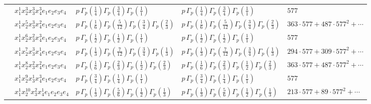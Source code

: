 \documentclass[11pt]{article}
\begin{document}
\begin{table}[ht]
{\begin{tabular}{@{}lllll@{}}
 & $x_{1}^{1} x_{2}^{3} x_{3}^{3} x_{4}^{3}  e_{1} e_{2} e_{3} e_{4}$ & $p \, \Gamma_p \left( \frac{1}{4} \right) \Gamma_p \left( \frac{3}{4} \right) \Gamma_p \left( \frac{1}{1} \right)$ & $p \, \Gamma_p \left( \frac{1}{4} \right) \Gamma_p \left( \frac{3}{4} \right) \Gamma_p \left( \frac{1}{1} \right)$ & $577$ \\
 & $x_{1}^{1} x_{2}^{5} x_{3}^{3} x_{4}^{2}  e_{1} e_{2} e_{3} e_{4}$ & $p \, \Gamma_p \left( \frac{1}{6} \right) \Gamma_p \left( \frac{5}{12} \right) \Gamma_p \left( \frac{3}{4} \right) \Gamma_p \left( \frac{2}{3} \right)$ & $p \, \Gamma_p \left( \frac{1}{6} \right) \Gamma_p \left( \frac{5}{12} \right) \Gamma_p \left( \frac{3}{4} \right) \Gamma_p \left( \frac{2}{3} \right)$ & $363{\cdot}577{+}487{\cdot}577^{2}{+}\cdots$ \\
 & $x_{1}^{1} x_{2}^{6} x_{3}^{2} x_{4}^{3}  e_{1} e_{2} e_{3} e_{4}$ & $p \, \Gamma_p \left( \frac{1}{2} \right) \Gamma_p \left( \frac{1}{2} \right) \Gamma_p \left( \frac{1}{1} \right)$ & $p \, \Gamma_p \left( \frac{1}{2} \right) \Gamma_p \left( \frac{1}{2} \right) \Gamma_p \left( \frac{1}{1} \right)$ & $577$ \\
 & $x_{1}^{1} x_{2}^{7} x_{3}^{3} x_{4}^{1}  e_{1} e_{2} e_{3} e_{4}$ & $p \, \Gamma_p \left( \frac{1}{3} \right) \Gamma_p \left( \frac{7}{12} \right) \Gamma_p \left( \frac{3}{4} \right) \Gamma_p \left( \frac{1}{3} \right)$ & $p \, \Gamma_p \left( \frac{1}{3} \right) \Gamma_p \left( \frac{7}{12} \right) \Gamma_p \left( \frac{3}{4} \right) \Gamma_p \left( \frac{1}{3} \right)$ & $294{\cdot}577{+}309{\cdot}577^{2}{+}\cdots$ \\
 & $x_{1}^{1} x_{2}^{8} x_{3}^{2} x_{4}^{2}  e_{1} e_{2} e_{3} e_{4}$ & $p \, \Gamma_p \left( \frac{1}{6} \right) \Gamma_p \left( \frac{2}{3} \right) \Gamma_p \left( \frac{1}{2} \right) \Gamma_p \left( \frac{2}{3} \right)$ & $p \, \Gamma_p \left( \frac{1}{6} \right) \Gamma_p \left( \frac{2}{3} \right) \Gamma_p \left( \frac{1}{2} \right) \Gamma_p \left( \frac{2}{3} \right)$ & $363{\cdot}577{+}487{\cdot}577^{2}{+}\cdots$ \\
 & $x_{1}^{1} x_{2}^{9} x_{3}^{1} x_{4}^{3}  e_{1} e_{2} e_{3} e_{4}$ & $p \, \Gamma_p \left( \frac{3}{4} \right) \Gamma_p \left( \frac{1}{4} \right) \Gamma_p \left( \frac{1}{1} \right)$ & $p \, \Gamma_p \left( \frac{3}{4} \right) \Gamma_p \left( \frac{1}{4} \right) \Gamma_p \left( \frac{1}{1} \right)$ & $577$ \\
 & $x_{1}^{1} x_{2}^{10} x_{3}^{2} x_{4}^{1}  e_{1} e_{2} e_{3} e_{4}$ & $p \, \Gamma_p \left( \frac{1}{3} \right) \Gamma_p \left( \frac{5}{6} \right) \Gamma_p \left( \frac{1}{2} \right) \Gamma_p \left( \frac{1}{3} \right)$ & $p \, \Gamma_p \left( \frac{1}{3} \right) \Gamma_p \left( \frac{5}{6} \right) \Gamma_p \left( \frac{1}{2} \right) \Gamma_p \left( \frac{1}{3} \right)$ & $213{\cdot}577{+}89{\cdot}577^{2}{+}\cdots$ \\

\end{tabular}}
\end{table}
\end{document}
